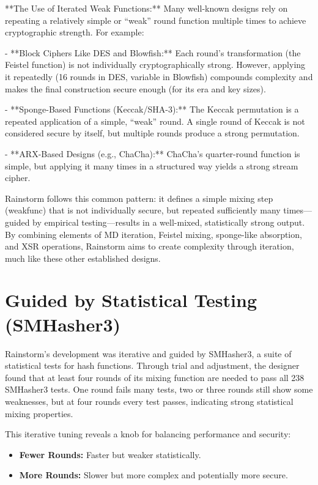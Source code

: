 \documentclass[11pt,a4paper]{article}
\begin{document}
**The Use of Iterated Weak Functions:**  
Many well-known designs rely on repeating a relatively simple or “weak” round function multiple times to achieve cryptographic strength. For example:

- **Block Ciphers Like DES and Blowfish:** Each round’s transformation (the Feistel function) is not individually cryptographically strong. However, applying it repeatedly (16 rounds in DES, variable in Blowfish) compounds complexity and makes the final construction secure enough (for its era and key sizes).
  
- **Sponge-Based Functions (Keccak/SHA-3):** The Keccak permutation is a repeated application of a simple, “weak” round. A single round of Keccak is not considered secure by itself, but multiple rounds produce a strong permutation.

- **ARX-Based Designs (e.g., ChaCha):** ChaCha’s quarter-round function is simple, but applying it many times in a structured way yields a strong stream cipher.

Rainstorm follows this common pattern: it defines a simple mixing step (weakfunc) that is not individually secure, but repeated sufficiently many times—guided by empirical testing—results in a well-mixed, statistically strong output. By combining elements of MD iteration, Feistel mixing, sponge-like absorption, and XSR operations, Rainstorm aims to create complexity through iteration, much like these other established designs.

\section*{Guided by Statistical Testing (SMHasher3)}
Rainstorm’s development was iterative and guided by SMHasher3, a suite of statistical tests for hash functions. Through trial and adjustment, the designer found that at least four rounds of its mixing function are needed to pass all 238 SMHasher3 tests. One round fails many tests, two or three rounds still show some weaknesses, but at four rounds every test passes, indicating strong statistical mixing properties.

This iterative tuning reveals a knob for balancing performance and security:  
\begin{itemize}
  \item \textbf{Fewer Rounds:} Faster but weaker statistically.  
  \item \textbf{More Rounds:} Slower but more complex and potentially more secure.
\end{itemize}
\end{document}
